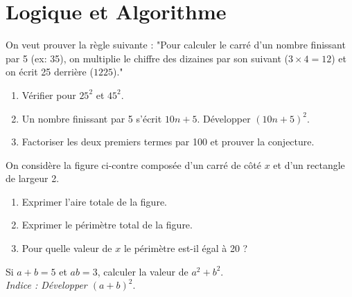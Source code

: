 \documentclass[a4paper]{book}
\begin{document}
    \section{Logique et Algorithme}

    \begin{exercice}
        On veut prouver la règle suivante : "Pour calculer le carré d'un nombre finissant par 5 (ex: 35), on multiplie le chiffre des dizaines par son suivant ($3 \times 4 = 12$) et on écrit 25 derrière ($1225$)."
        \begin{enumerate}
            \item Vérifier pour $25^2$ et $45^2$.
            \item Un nombre finissant par 5 s'écrit $10n + 5$. Développer $(10n+5)^2$.
            \item Factoriser les deux premiers termes par 100 et prouver la conjecture.
        \end{enumerate}
    \end{exercice}
    
    \begin{exercice}
        \begin{minipage}{0.65\linewidth}
            On considère la figure ci-contre composée d'un carré de côté $x$ et d'un rectangle de largeur 2.
            \begin{enumerate}
                \item Exprimer l'aire totale de la figure.
                \item Exprimer le périmètre total de la figure.
                \item Pour quelle valeur de $x$ le périmètre est-il égal à 20 ?
            \end{enumerate}
        \end{minipage}
        \hfill
        \begin{minipage}{0.3\linewidth}
        \end{minipage}
    \end{exercice}
    
    \begin{exercice}
        Si $a + b = 5$ et $ab = 3$, calculer la valeur de $a^2 + b^2$. \\
        \textit{Indice : Développer $(a+b)^2$}.
    \end{exercice}
    
\end{document}
